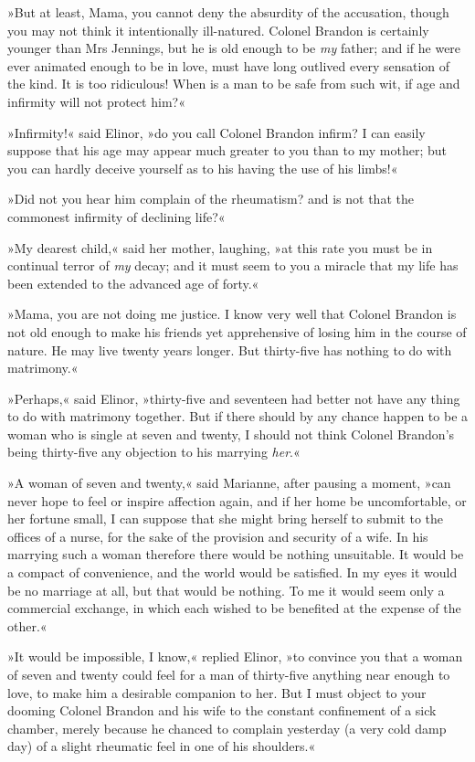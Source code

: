 »But at least, Mama, you cannot deny the absurdity of the accusation, though you may not think it intentionally ill-natured. Colonel Brandon is certainly younger than Mrs Jennings, but he is old enough to be \textit{my} father; and if he were ever animated enough to be in love, must have long outlived every sensation of the kind. It is too ridiculous! When is a man to be safe from such wit, if age and infirmity will not protect him?«

»Infirmity!« said Elinor, »do you call Colonel Brandon infirm? I can easily suppose that his age may appear much greater to you than to my mother; but you can hardly deceive yourself as to his having the use of his limbs!«

»Did not you hear him complain of the rheumatism? and is not that the commonest infirmity of declining life?«

»My dearest child,« said her mother, laughing, »at this rate you must be in continual terror of \textit{my} decay; and it must seem to you a miracle that my life has been extended to the advanced age of forty.«

»Mama, you are not doing me justice. I know very well that Colonel Brandon is not old enough to make his friends yet apprehensive of losing him in the course of nature. He may live twenty years longer. But thirty-five has nothing to do with matrimony.«

»Perhaps,« said Elinor, »thirty-five and seventeen had better not have any thing to do with matrimony together. But if there should by any chance happen to be a woman who is single at seven and twenty, I should not think Colonel Brandon’s being thirty-five any objection to his marrying \textit{her}.«

»A woman of seven and twenty,« said Marianne, after pausing a moment, »can never hope to feel or inspire affection again, and if her home be uncomfortable, or her fortune small, I can suppose that she might bring herself to submit to the offices of a nurse, for the sake of the provision and security of a wife. In his marrying such a woman therefore there would be nothing unsuitable. It would be a compact of convenience, and the world would be satisfied. In my eyes it would be no marriage at all, but that would be nothing. To me it would seem only a commercial exchange, in which each wished to be benefited at the expense of the other.«

»It would be impossible, I know,« replied Elinor, »to convince you that a woman of seven and twenty could feel for a man of thirty-five anything near enough to love, to make him a desirable companion to her. But I must object to your dooming Colonel Brandon and his wife to the constant confinement of a sick chamber, merely because he chanced to complain yesterday (a very cold damp day) of a slight rheumatic feel in one of his shoulders.«

